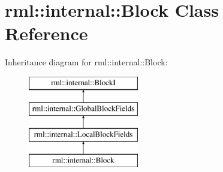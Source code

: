 \hypertarget{classrml_1_1internal_1_1Block}{}\section{rml\+:\+:internal\+:\+:Block Class Reference}
\label{classrml_1_1internal_1_1Block}
Inheritance diagram for rml\+:\+:internal\+:\+:Block\+:\begin{figure}[H]
\begin{center}
\leavevmode
\includegraphics[height=4.000000cm]{classrml_1_1internal_1_1Block}
\end{center}
\end{figure}
